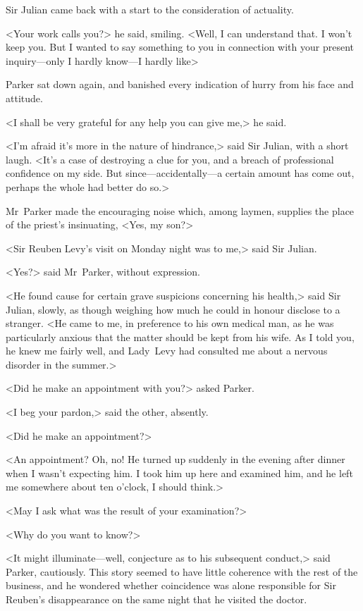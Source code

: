 Sir Julian came back with a start to the consideration of actuality.

<Your work calls you?> he said, smiling. <Well, I can understand that. I won't keep you. But I wanted to say something to you in connection with your present inquiry—only I hardly know—I hardly like\longdash>

Parker sat down again, and banished every indication of hurry from his face and attitude.

<I shall be very grateful for any help you can give me,> he said.

<I'm afraid it's more in the nature of hindrance,> said Sir Julian, with a short laugh. <It's a case of destroying a clue for you, and a breach of professional confidence on my side. But since—accidentally—a certain amount has come out, perhaps the whole had better do so.>

Mr~Parker made the encouraging noise which, among laymen, supplies the place of the priest's insinuating, <Yes, my son?>

<Sir Reuben Levy's visit on Monday night was to me,> said Sir Julian.

<Yes?> said Mr~Parker, without expression.

<He found cause for certain grave suspicions concerning his health,> said Sir Julian, slowly, as though weighing how much he could in honour disclose to a stranger. <He came to me, in preference to his own medical man, as he was particularly anxious that the matter should be kept from his wife. As I told you, he knew me fairly well, and Lady~Levy had consulted me about a nervous disorder in the summer.>

<Did he make an appointment with you?> asked Parker.

<I beg your pardon,> said the other, absently.

<Did he make an appointment?>

<An appointment? Oh, no! He turned up suddenly in the evening after dinner when I wasn't expecting him. I took him up here and examined him, and he left me somewhere about ten o'clock, I should think.>

<May I ask what was the result of your examination?>

<Why do you want to know?>

<It might illuminate—well, conjecture as to his subsequent conduct,> said Parker, cautiously. This story seemed to have little coherence with the rest of the business, and he wondered whether coincidence was alone responsible for Sir Reuben's disappearance on the same night that he visited the doctor.

